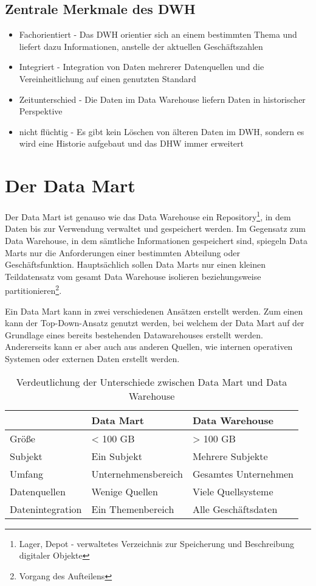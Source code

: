 \subsection{Zentrale Merkmale des DWH}
\begin{itemize}
	\item Fachorientiert - Das DWH orientier sich an einem bestimmten Thema und liefert dazu Informationen, anstelle der aktuellen Geschäftszahlen
	\item Integriert - Integration von Daten mehrerer Datenquellen und die Vereinheitlichung auf einen genutzten Standard
	\item Zeitunterschied - Die Daten im Data Warehouse liefern Daten in historischer Perspektive
	\item nicht flüchtig - Es gibt kein Löschen von älteren Daten im DWH, sondern es wird eine Historie aufgebaut und das DHW immer erweitert
\end{itemize}
\cite{Bigdata-Insider:DW}\cite{Astera:Kimmball_Inmon}
\section{Der Data Mart}
Der Data Mart ist genauso wie das Data Warehouse ein Repository\footnote{Lager, Depot - verwaltetes Verzeichnis zur Speicherung und Beschreibung digitaler Objekte\cite{Wikipedia:Repository}}, in dem Daten bis zur Verwendung verwaltet und gespeichert werden. Im Gegensatz zum Data Warehouse, in dem sämtliche Informationen gespeichert sind, spiegeln Data Marts nur die Anforderungen einer bestimmten Abteilung oder Geschäftsfunktion. Hauptsächlich sollen Data Marts nur einen kleinen Teildatensatz vom gesamt Data Warehouse isolieren beziehungsweise partitionieren\footnote{Vorgang des Aufteilens}.

Ein Data Mart kann in zwei verschiedenen Ansätzen erstellt werden. Zum einen kann der Top-Down-Ansatz genutzt werden, bei welchem der Data Mart auf der Grundlage eines bereits bestehenden Datawarehouses erstellt werden. Andererseits kann er aber auch aus anderen Quellen, wie internen operativen Systemen oder externen Daten erstellt werden.\cite{Talend:Data_Mart}
\begin{table}[H]
	\centering
	\begin{tabular}{l|ll}
						& Data Mart 			& Data Warehouse \\
						\hline
	Größe				& < 100 GB				& > 100 GB \\
	Subjekt				& Ein Subjekt			& Mehrere Subjekte\\
	Umfang				& Unternehmensbereich	& Gesamtes Unternehmen\\
	Datenquellen		& Wenige Quellen		& Viele Quellsysteme\\
	Datenintegration	& Ein Themenbereich		& Alle Geschäftsdaten
	\end{tabular}
	\caption{Verdeutlichung der Unterschiede zwischen Data Mart und Data Warehouse}
\end{table}
